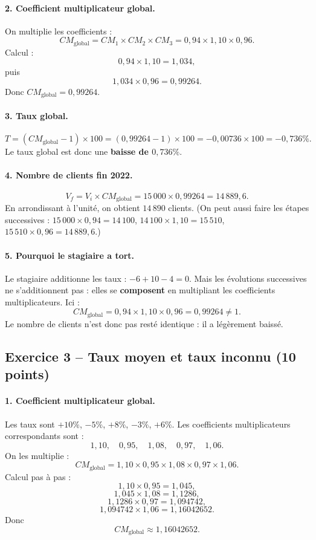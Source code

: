 \documentclass[12pt,a4paper]{article}
\begin{document}
\paragraph{2. Coefficient multiplicateur global.}
On multiplie les coefficients :
\[
CM_{\text{global}} = CM_1 \times CM_2 \times CM_3
= 0{,}94 \times 1{,}10 \times 0{,}96.
\]
Calcul :
\[
0{,}94 \times 1{,}10 = 1{,}034,
\]
puis
\[
1{,}034 \times 0{,}96 = 0{,}99264.
\]
Donc \(CM_{\text{global}} = 0{,}99264\).

\paragraph{3. Taux global.}
\[
T = (CM_{\text{global}} - 1) \times 100
= (0{,}99264 - 1) \times 100
= -0{,}00736 \times 100
= -0{,}736\%.
\]
Le taux global est donc une \textbf{baisse de \(0{,}736\%\)}.

\paragraph{4. Nombre de clients fin 2022.}
\[
V_f = V_i \times CM_{\text{global}} = 15\,000 \times 0{,}99264 = 14\,889{,}6.
\]
En arrondissant à l'unité, on obtient \(14\,890\) clients.  
(On peut aussi faire les étapes successives :  
\(15\,000 \times 0{,}94 = 14\,100\),  
\(14\,100 \times 1{,}10 = 15\,510\),  
\(15\,510 \times 0{,}96 = 14\,889{,}6\).)

\paragraph{5. Pourquoi le stagiaire a tort.}
Le stagiaire additionne les taux : \(-6+10-4=0\). Mais les évolutions successives ne s'additionnent pas : elles se \textbf{composent} en multipliant les coefficients multiplicateurs.  
Ici :
\[
CM_{\text{global}} = 0{,}94 \times 1{,}10 \times 0{,}96 = 0{,}99264 \neq 1.
\]
Le nombre de clients n'est donc pas resté identique : il a légèrement baissé.

\subsection*{Exercice 3 -- Taux moyen et taux inconnu (10 points)}

\paragraph{1. Coefficient multiplicateur global.}
Les taux sont \(+10\%\), \(-5\%\), \(+8\%\), \(-3\%\), \(+6\%\).  
Les coefficients multiplicateurs correspondants sont :
\[
1{,}10,\quad 0{,}95,\quad 1{,}08,\quad 0{,}97,\quad 1{,}06.
\]
On les multiplie :
\[
CM_{\text{global}} = 1{,}10 \times 0{,}95 \times 1{,}08 \times 0{,}97 \times 1{,}06.
\]
Calcul pas à pas :
\[
1{,}10 \times 0{,}95 = 1{,}045,
\]
\[
1{,}045 \times 1{,}08 = 1{,}1286,
\]
\[
1{,}1286 \times 0{,}97 = 1{,}094742,
\]
\[
1{,}094742 \times 1{,}06 = 1{,}16042652.
\]
Donc
\[
CM_{\text{global}} \approx 1{,}16042652.
\]
\end{document}
